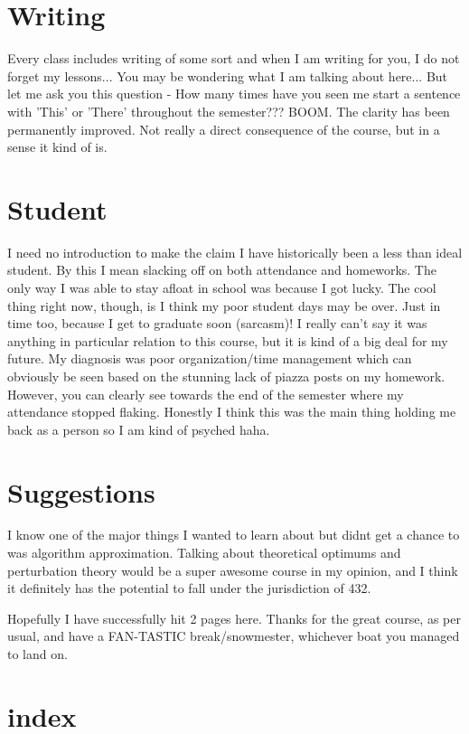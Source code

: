 \documentclass{article}
\begin{document}
\section{Writing} 
Every class includes writing of some sort and when I am writing for you, I do not forget my lessons... You may be wondering what I am talking about here... But let me ask you this question - How many times have you seen me start a sentence with 'This' or 'There' throughout the semester??? BOOM. The clarity has been permanently improved. Not really a direct consequence of the course, but in a sense it kind of is. 

\section{Student}
I need no introduction to make the claim I have historically been a less than ideal student. By this I mean slacking off on both attendance and homeworks. The only way I was able to stay afloat in school was because I got lucky. The cool thing right now, though, is I think my poor student days may be over. Just in time too, because I get to graduate soon (sarcasm)! I really can't say it was anything in particular relation to this course, but it is kind of a big deal for my future. My diagnosis was poor organization/time management which can obviously be seen based on the stunning lack of piazza posts on my homework. However, you can clearly see towards the end of the semester where my attendance stopped flaking. Honestly I think this was the main thing holding me back as a person so I am kind of psyched haha. 

\section{Suggestions}
I know one of the major things I wanted to learn about but didnt get a chance to was algorithm approximation. Talking about theoretical optimums and perturbation theory would be a super awesome course in my opinion, and I think it definitely has the potential to fall under the jurisdiction of 432. 

Hopefully I have successfully hit 2 pages here. Thanks for the great course, as per usual, and have a FAN-TASTIC break/snowmester, whichever boat you managed to land on. 



\section{index}
\end{document}
